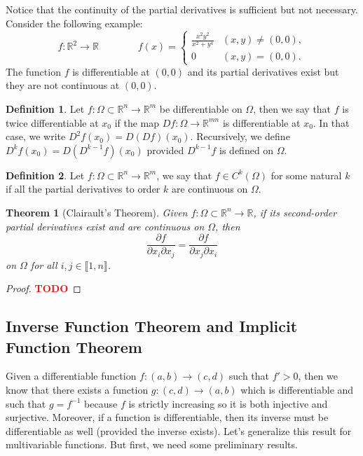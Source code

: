 \documentclass{article}
\theoremstyle{plain}
\newtheorem{theorem}{Theorem}[subsection]
\theoremstyle{definition}
\newtheorem*{definition}{Definition}
\newcommand{\R}{\mathbb{R}}
\newcommand{\Iint}[2]{\llbracket #1 , #2 \rrbracket}
\newcommand{\td}{\textcolor{red}{\textbf{TODO}}}
\begin{document}
Notice that the continuity of the partial derivatives is sufficient but not necessary. Consider the following example:
$$f : \R^2 \to \R \qquad \qquad f(x) = \begin{cases}
    \frac{x^2y^2}{x^2 + y^4} & (x,y)\neq (0,0), \\ 0 & (x,y) = (0,0).
\end{cases}$$
The function $f$ is differentiable at $(0,0)$ and its partial derivatives exist but they are not continuous at $(0,0)$.

\begin{definition}
    Let $f:\Omega \subset \R^n \to \R^m$ be differentiable on $\Omega$, then we say that $f$ is twice differentiable at $x_0$ if the map $Df : \Omega \to \R^{mn}$ is differentiable at $x_0$. In that case, we write $D^2f(x_0) = D(Df)(x_0)$. Recursively, we define $D^kf(x_0) = D(D^{k-1}f)(x_0)$ provided $D^{k-1}f$ is defined on $\Omega$.
\end{definition}

\begin{definition}
    Let $f : \Omega \subset \R^n \to \R^m$, we say that $f \in C^{k}(\Omega)$ for some natural $k$ if all the partial derivatives to order $k$ are continuous on $\Omega$.
\end{definition}

\begin{theorem}[Clairault's Theorem]
    Given $f : \Omega \subset \R^n \to \R$, if its second-order partial derivatives exist and are continuous on $\Omega$, then
    $$\frac{\partial f}{\partial x_i \partial x_j} = \frac{\partial f}{\partial x_j \partial x_i}$$
    on $\Omega$ for all $i,j \in \Iint{1}{n}$.
\end{theorem}

\begin{proof}
    \td 
\end{proof}

\subsection{Inverse Function Theorem and Implicit Function Theorem}

Given a differentiable function $f : (a,b) \to (c,d)$ such that $f' > 0$, then we know that there exists a function $g:(c,d) \to (a,b)$ which is differentiable and such that $g = f^{-1}$ because $f$ is strictly increasing so it is both injective and surjective. Moreover, if a function is differentiable, then its inverse must be differentiable as well (provided the inverse exists). Let's generalize this result for multivariable functions. But first, we need some preliminary results.
\end{document}
